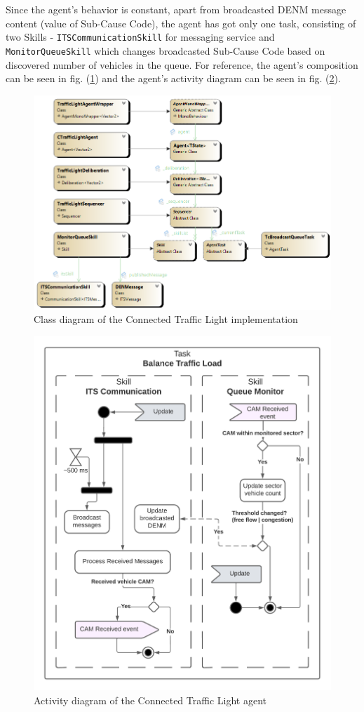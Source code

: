 \documentclass[main.tex]{subfiles}
\begin{document}
Since the agent's behavior is constant, apart from broadcasted DENM message content (value of
Sub-Cause Code), the agent has got only one task, consisting of two Skills - 
\texttt{ITSCommunicationSkill} for messaging service and \texttt{MonitorQueueSkill} which 
changes broadcasted Sub-Cause Code based on discovered number of vehicles in the queue. 
For reference, the agent's composition can be seen in fig. (\ref{cd-trafficLight}) and 
the agent's activity diagram can be seen in fig. (\ref{ad-trafficLight}).


\begin{figure}[htbp]
    \centering
    \includegraphics[width=.9\textwidth]{cd-SmartTrafficLight.png}
    \caption{Class diagram of the Connected Traffic Light implementation}
    \label{cd-trafficLight}
\end{figure}

\begin{figure}[htbp]
    \centering
    \includegraphics[width=.8\textwidth]{SmartTrafficLight.png}
    \caption{Activity diagram of the Connected Traffic Light agent}
    \label{ad-trafficLight}
\end{figure}
\end{document}
